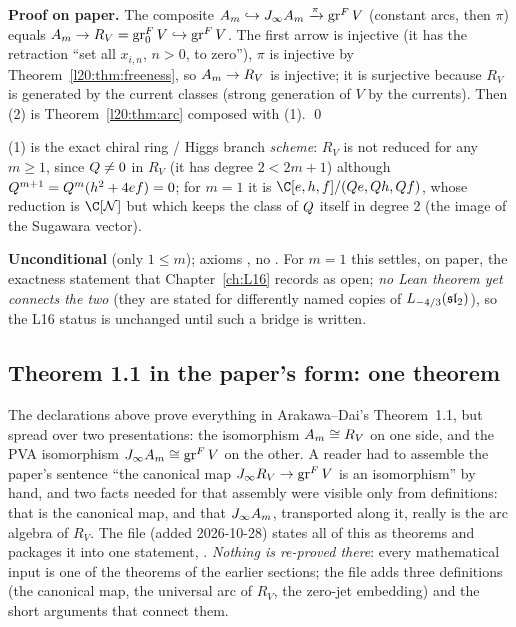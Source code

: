 \textbf{Proof on paper.} The composite $A_m\hookrightarrow J_\infty A_m\xrightarrow{\pi}\operatorname{gr}^F V$ (constant arcs,
then $\pi$) equals $A_m\to R_V=\operatorname{gr}^F_0V\hookrightarrow\operatorname{gr}^F V$. The first arrow is injective (it has the
retraction ``set all $x_{i,n}$, $n>0$, to zero''), $\pi$ is injective by Theorem~\ref{l20:thm:freeness}, so
$A_m\to R_V$ is injective; it is surjective because $R_V$ is generated by the current classes (strong
generation of $V$ by the currents). Then (2) is Theorem~\ref{l20:thm:arc} composed with (1). \qed

\begin{physics}
(1) is the exact chiral ring / Higgs branch \emph{scheme}: $R_V$ is not reduced for any $m\ge1$, since
$Q\neq0$ in $R_V$ (it has degree $2<2m+1$) although $Q^{m+1}=Q^m(h^2+4ef)=0$; for $m=1$ it is
$\C[e,h,f]/(\ltwentyQ e,\ltwentyQ h,\ltwentyQ f)$, whose reduction is $\C[\mathcal N]$ but which keeps the class of $Q$
itself in degree 2 (the image of the Sugawara vector).
\end{physics}

\begin{status}
\textbf{Unconditional} (only $1\le m$); axioms , no .
For $m=1$ this settles, on paper, the exactness statement  that Chapter~\ref{ch:L16}
records as open; \emph{no Lean theorem yet connects the two} (they are stated for differently named copies of
$L_{-4/3}(\mathfrak{sl}_2)$), so the L16 status is unchanged until such a bridge is written.
\end{status}

\subsection{Theorem 1.1 in the paper's form: one theorem}\label{l20:sec:ad11}

The declarations above prove everything in Arakawa--Dai's Theorem~1.1, but spread over two presentations: the isomorphism
$A_m\cong R_V$ on one side, and the PVA isomorphism $J_\infty A_m\cong\operatorname{gr}^F V$ on the other. A reader had to
assemble the paper's sentence ``the canonical map $J_\infty R_V\to\operatorname{gr}^F V$ is an isomorphism'' by hand, and two facts
needed for that assembly were visible only from definitions: that  is the canonical map, and that
$J_\infty A_m$, transported along it, really is the arc algebra of $R_V$. The file
 (added 2026-10-28) states all of this as theorems
and packages it into one statement, . \emph{Nothing is re-proved there}: every mathematical input
is one of the theorems of the earlier sections; the file adds three definitions (the canonical map, the universal arc of $R_V$,
the zero-jet embedding) and the short arguments that connect them.

